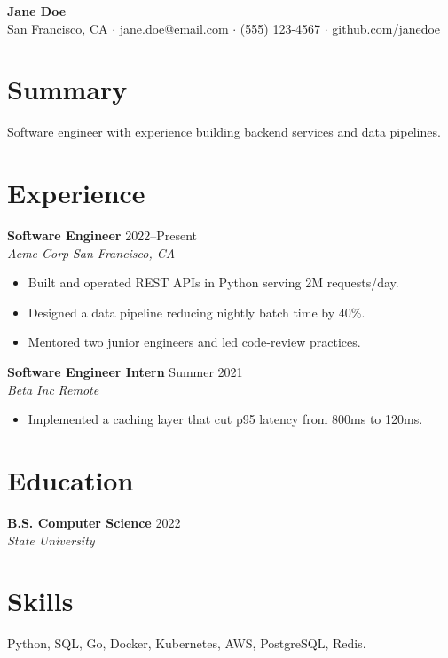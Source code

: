 \documentclass[letterpaper,11pt]{article}
\newcommand{\role}[4]{\textbf{#1} \hfill #2 \\ \textit{#3} \hfill \textit{#4}}
\begin{document}
\begin{center}
  {\LARGE \textbf{Jane Doe}}\\[2pt]
  San Francisco, CA $\cdot$ jane.doe@email.com $\cdot$ (555) 123-4567 $\cdot$
  \href{https://github.com/janedoe}{github.com/janedoe}
\end{center}

\section{Summary}
Software engineer with experience building backend services and data pipelines.

\section{Experience}
\role{Software Engineer}{2022--Present}{Acme Corp}{San Francisco, CA}
\begin{itemize}
  \item Built and operated REST APIs in Python serving 2M requests/day.
  \item Designed a data pipeline reducing nightly batch time by 40\%.
  \item Mentored two junior engineers and led code-review practices.
\end{itemize}

\role{Software Engineer Intern}{Summer 2021}{Beta Inc}{Remote}
\begin{itemize}
  \item Implemented a caching layer that cut p95 latency from 800ms to 120ms.
\end{itemize}

\section{Education}
\role{B.S. Computer Science}{2022}{State University}{}

\section{Skills}
Python, SQL, Go, Docker, Kubernetes, AWS, PostgreSQL, Redis.
\end{document}
